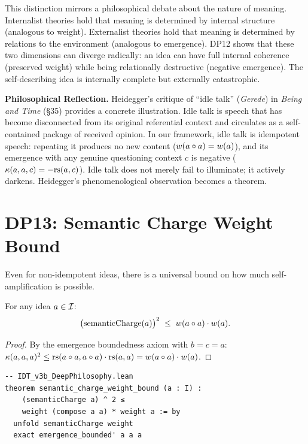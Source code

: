 This distinction mirrors a philosophical debate about the nature of
meaning. Internalist theories hold that meaning is determined by
internal structure (analogous to weight). Externalist theories hold
that meaning is determined by relations to the environment (analogous
to emergence). DP12 shows that these two dimensions can diverge
radically: an idea can have full internal coherence (preserved weight)
while being relationally destructive (negative emergence). The
self-describing idea is internally complete but externally catastrophic.

\begin{reflectionbox}
\textbf{Philosophical Reflection.}
Heidegger's critique of ``idle talk'' (\textit{Gerede}) in
\textit{Being and Time} (\S35) provides a concrete illustration.
Idle talk is speech that has become disconnected from its original
referential context and circulates as a self-contained package of
received opinion. In our framework, idle talk is idempotent speech:
repeating it produces no new content ($w(a \circ a) = w(a)$), and
its emergence with any genuine questioning context $c$ is negative
($\kappa(a,a,c) = -\mathrm{rs}(a,c)$). Idle talk does not merely fail to
illuminate; it actively darkens. Heidegger's phenomenological
observation becomes a theorem.
\end{reflectionbox}

\section{DP13: Semantic Charge Weight Bound}

Even for non-idempotent ideas, there is a universal bound on how much
self-amplification is possible.

\begin{theorem}
\label{thm:semantic-charge-bound}
For any idea $a \in \mathcal{I}$:
\[
\bigl(\mathrm{semanticCharge}(a)\bigr)^2 \;\leq\;
w(a \circ a) \cdot w(a).
\]
\end{theorem}

\begin{proof}
By the emergence boundedness axiom with $b = c = a$:
$\kappa(a, a, a)^2 \leq \mathrm{rs}(a \circ a, a \circ a) \cdot
\mathrm{rs}(a, a) = w(a \circ a) \cdot w(a)$.
\end{proof}

\begin{lstlisting}
-- IDT_v3b_DeepPhilosophy.lean
theorem semantic_charge_weight_bound (a : I) :
    (semanticCharge a) ^ 2 ≤
    weight (compose a a) * weight a := by
  unfold semanticCharge weight
  exact emergence_bounded' a a a
\end{lstlisting}

